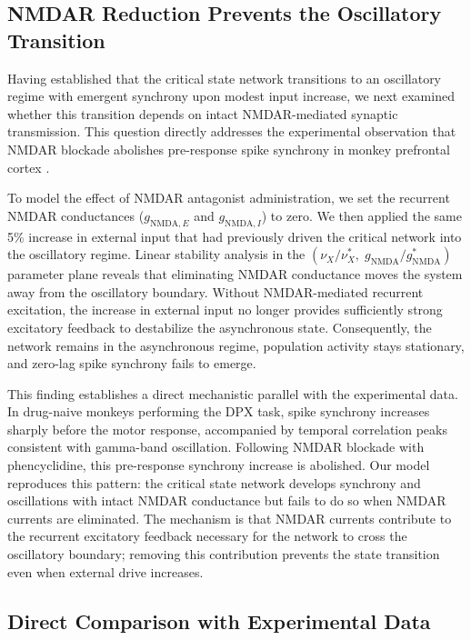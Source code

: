 \documentclass[10pt]{article}
\begin{document}
\subsection{NMDAR Reduction Prevents the Oscillatory Transition}

Having established that the critical state network transitions to an oscillatory regime with emergent synchrony upon modest input increase, we next examined whether this transition depends on intact NMDAR-mediated synaptic transmission. This question directly addresses the experimental observation that NMDAR blockade abolishes pre-response spike synchrony in monkey prefrontal cortex \citep{zick2018blocking}.

To model the effect of NMDAR antagonist administration, we set the recurrent NMDAR conductances ($g_{\mathrm{NMDA},E}$ and $g_{\mathrm{NMDA},I}$) to zero. We then applied the same 5\% increase in external input that had previously driven the critical network into the oscillatory regime. Linear stability analysis in the $(\nu_X / \nu_X^*, \; g_{\mathrm{NMDA}} / g_{\mathrm{NMDA}}^*)$ parameter plane reveals that eliminating NMDAR conductance moves the system away from the oscillatory boundary. Without NMDAR-mediated recurrent excitation, the increase in external input no longer provides sufficiently strong excitatory feedback to destabilize the asynchronous state. Consequently, the network remains in the asynchronous regime, population activity stays stationary, and zero-lag spike synchrony fails to emerge.

This finding establishes a direct mechanistic parallel with the experimental data. In drug-naive monkeys performing the DPX task, spike synchrony increases sharply before the motor response, accompanied by temporal correlation peaks consistent with gamma-band oscillation. Following NMDAR blockade with phencyclidine, this pre-response synchrony increase is abolished. Our model reproduces this pattern: the critical state network develops synchrony and oscillations with intact NMDAR conductance but fails to do so when NMDAR currents are eliminated. The mechanism is that NMDAR currents contribute to the recurrent excitatory feedback necessary for the network to cross the oscillatory boundary; removing this contribution prevents the state transition even when external drive increases.

\subsection{Direct Comparison with Experimental Data}
\end{document}
